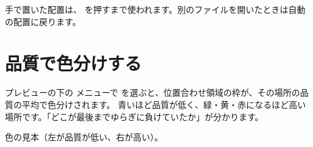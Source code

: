 \begin{caution}
  手で置いた配置は、 を押すまで使われます。別のファイルを開いたときは自動の配置に戻ります。
\end{caution}

\section{品質で色分けする}\label{sec:heatmap}

プレビューの下の  メニューで  を選ぶと、位置合わせ領域の枠が、その場所の品質の平均で色分けされます。
青いほど品質が低く、緑・黄・赤になるほど高い場所です。「どこが最後までゆらぎに負けていたか」が分かります。


\begin{marklist}
  \item 色の見本（左が品質が低い、右が高い）。
\end{marklist}
